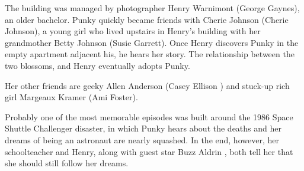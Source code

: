 The building was managed by photographer Henry Warnimont (George Gaynes), an older bachelor. Punky quickly became friends with Cherie Johnson (Cherie Johnson), a young girl who lived upstairs in Henry's building with her grandmother Betty Johnson (Susie Garrett). Once Henry discovers Punky in the empty apartment adjacent his, he hears her story. The relationship between the two blossoms, and Henry eventually adopts Punky.

Her other friends are geeky Allen Anderson (Casey Ellison \cite{Rabitz:2000a}) and stuck-up rich girl Margeaux Kramer (Ami Foster).

Probably one of the most memorable episodes was built around the 1986 Space Shuttle Challenger disaster, in which Punky hears about the deaths and her dreams of being an astronaut are nearly squashed. In the end, however, her schoolteacher and Henry, along with guest star Buzz Aldrin \cite{Danileiko:1994a}, both tell her that she should still follow her dreams.

